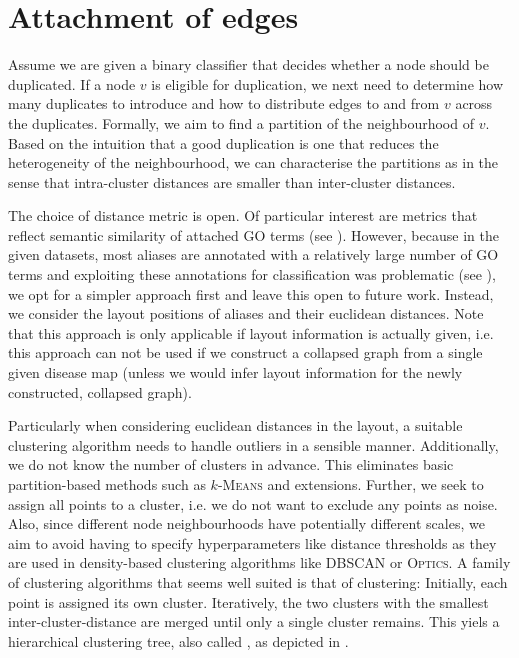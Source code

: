 \documentclass[
	fontsize=10pt, %
	twoside=false, %
	secnumdepth=1, %
  toc=indentunnumbered %
]{kaobook}
\begin{document}
\section{Attachment of edges}
\label{sec:edge-attachment}


Assume we are given a binary classifier that decides whether a node should be
duplicated. If a node $v$ is eligible for duplication, we next need to determine
how many duplicates to introduce and how to distribute edges to and from $v$
across the duplicates. Formally, we aim to find a partition of the neighbourhood
of $v$. Based on the intuition that a good duplication is one that reduces the
heterogeneity of the neighbourhood, we can characterise the partitions as
 in the sense that intra-cluster distances are smaller than
inter-cluster distances.

The choice of distance metric is open. Of particular interest are metrics that
reflect semantic similarity of attached GO terms
(see ).
However, because in the given
datasets, most aliases are annotated with a relatively large number of GO terms
and exploiting these annotations for classification was problematic (see ),
we opt for a
simpler approach first and leave this open to future work. 
Instead, we consider the layout positions of aliases and their euclidean
distances. Note that this approach is only applicable if layout information is
actually given, i.e. this approach can not be used if we construct a collapsed
graph from a single given disease map (unless we would infer layout information
for the newly constructed, collapsed graph).

Particularly when considering euclidean distances in the layout, a suitable
clustering algorithm needs to handle outliers in a sensible manner.
Additionally, we do not know the number of clusters in advance. This eliminates
basic partition-based methods such as $k$-\textsc{Means} and extensions.
%
Further, we seek to assign all points to a cluster, i.e. we do not want to
exclude any points as noise. Also, since different node neighbourhoods have
potentially different scales, we aim to avoid having to specify hyperparameters
like distance thresholds as they are used in density-based clustering algorithms
like \textsc{DBSCAN} or \textsc{Optics}.
%
A family of clustering algorithms that seems well suited is that of
 clustering: Initially, each point is assigned its own
cluster. Iteratively, the two clusters with the smallest inter-cluster-distance
are merged until only a single cluster remains. This yiels a hierarchical
clustering tree, also called , as depicted in
.
\end{document}

